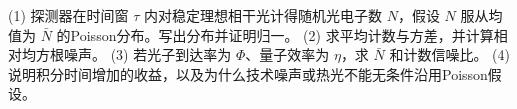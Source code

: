 (1) 探测器在时间窗 \(\tau\) 内对稳定理想相干光计得随机光电子数 \(N\)，假设 \(N\) 服从均值为 \(\bar N\) 的Poisson分布。写出分布并证明归一。
(2) 求平均计数与方差，并计算相对均方根噪声。
(3) 若光子到达率为 \(\Phi\)、量子效率为 \(\eta\)，求 \(\bar N\) 和计数信噪比。
(4) 说明积分时间增加的收益，以及为什么技术噪声或热光不能无条件沿用Poisson假设。
